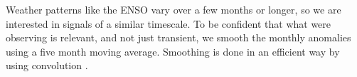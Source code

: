 Weather patterns like the ENSO vary over a few months or longer, so we are
interested in signals of a similar timescale. To be confident that what were
observing is relevant, and not just transient, we smooth the monthly anomalies using a five month moving average. Smoothing is done in an efficient way by using convolution \citep{gorry1990}.


